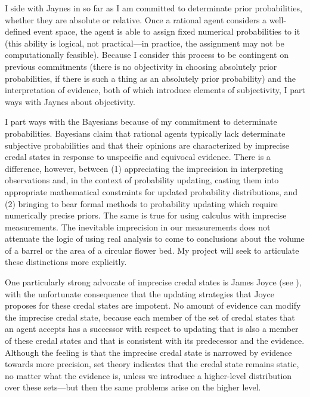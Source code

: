 \documentclass[11pt]{article}
\begin{document}
I side with Jaynes in so far as I am committed to determinate prior
probabilities, whether they are absolute or relative. Once a rational
agent considers a well-defined event space, the agent is able to
assign fixed numerical probabilities to it (this ability is logical,
not practical---in practice, the assignment may not be computationally
feasible). Because I consider this process to be contingent on
previous commitments (there is no objectivity in choosing absolutely
prior probabilities, if there is such a thing as an absolutely prior
probability) and the interpretation of evidence, both of which
introduce elements of subjectivity, I part ways with Jaynes about
objectivity.

I part ways with the  Bayesians because of my
commitment to determinate probabilities. 
Bayesians claim that rational agents typically lack determinate
subjective probabilities and that their opinions are characterized by
imprecise credal states in response to unspecific and equivocal
evidence. There is a difference, however, between (1) appreciating the
imprecision in interpreting observations and, in the context of
probability updating, casting them into appropriate mathematical
constraints for updated probability distributions, and (2) bringing to
bear formal methods to probability updating which require numerically
precise priors. The same is true for using calculus with imprecise
measurements. The inevitable imprecision in our measurements does not
attenuate the logic of using real analysis to come to conclusions
about the volume of a barrel or the area of a circular flower bed. My
project will seek to articulate these distinctions more explicitly.


One particularly strong advocate of imprecise credal states is James
Joyce (see ), with the unfortunate consequence
that the updating strategies that Joyce proposes for these credal
states are impotent. No amount of evidence can modify the imprecise
credal state, because each member of the set of credal states that an
agent accepts has a successor with respect to updating that is also a
member of these credal states and that is consistent with its
predecessor and the evidence. Although the feeling is that the
imprecise credal state is narrowed by evidence towards more precision,
set theory indicates that the credal state remains static, no
matter what the evidence is, unless we introduce a higher-level
distribution over these sets---but then the same problems arise on the
higher level.
\end{document}
